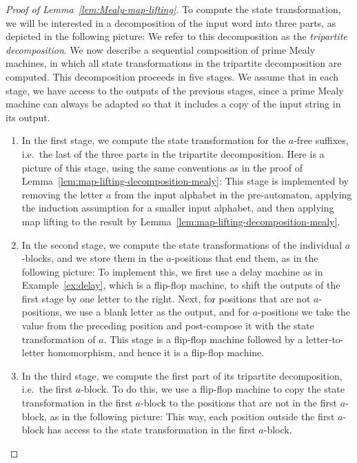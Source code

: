 \begin{proof}[Proof of Lemma~\ref{lem:Mealy-map-lifting}]
To compute the state transformation, we will be interested in a decomposition of the input word into  three parts,  as depicted in the following picture:
We refer to this decomposition as the \emph{tripartite decomposition}. We now describe a sequential composition of prime Mealy machines, in which all state transformations in the tripartite decomposition are computed.  This decomposition proceeds in five stages. We assume that in each stage, we have access to the outputs of the previous stages, since a prime Mealy machine can always be adapted so that it includes a copy of the input string in its output. 
\begin{enumerate}
    \item In the first stage, we compute the state transformation for the $a$-free suffixes, i.e.~the last of the three parts in the tripartite decomposition. Here is a picture of this stage, using the same conventions as in the proof of Lemma~\ref{lem:map-lifting-decomposition-mealy}:
    This stage is implemented by removing the letter $a$ from the input alphabet in the pre-automaton, applying the induction assumption for a smaller input alphabet, and then applying map lifting to the result by Lemma~\ref{lem:map-lifting-decomposition-mealy}.
    
    \item In the second stage, we compute the state transformations of the individual $a$-blocks, and we store them in the $a$-positions that end them, as in the following picture:
    To implement this, we first use a delay machine as in Example~\ref{ex:delay}, which is a flip-flop machine, to shift the outputs of the first stage by one letter to the right. Next, for positions that are not $a$-positions, we use a blank letter as the output, and for $a$-positions we take the value from the preceding position and post-compose it with the state transformation of $a$. This stage is a flip-flop machine followed by a letter-to-letter homomorphism, and hence it is a flip-flop machine.

    \item In the third stage, we  compute  the first part of its tripartite decomposition, i.e.~the first $a$-block. To do this,  we use a flip-flop machine to copy the state transformation in the first $a$-block to the positions that are not in the first $a$-block,  as in the following picture:
    This way, each position outside the first $a$-block has access to the state transformation in the first $a$-block.


\end{enumerate}
\end{proof}

